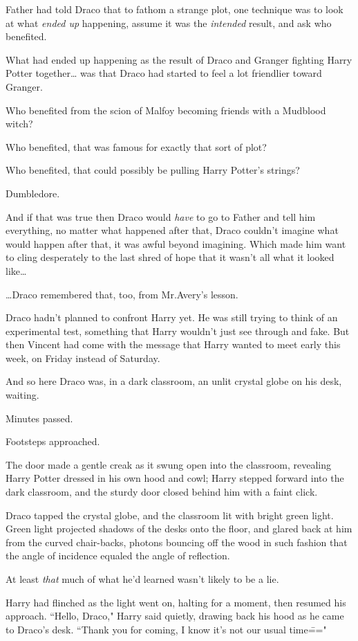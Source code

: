 Father had told Draco that to fathom a strange plot, one technique was to look at what \emph{ended up} happening, assume it was the \emph{intended} result, and ask who benefited.

What had ended up happening as the result of Draco and Granger fighting Harry Potter together{\ldots} was that Draco had started to feel a lot friendlier toward Granger.

Who benefited from the scion of Malfoy becoming friends with a Mudblood witch?

Who benefited, that was famous for exactly that sort of plot?

Who benefited, that could possibly be pulling Harry Potter's strings?

Dumbledore.

And if that was true then Draco would \emph{have} to go to Father and tell him everything, no matter what happened after that, Draco couldn't imagine what would happen after that, it was awful beyond imagining. Which made him want to cling desperately to the last shred of hope that it wasn't all what it looked like{\ldots}

{\ldots}Draco remembered that, too, from Mr.\?Avery's lesson.

Draco hadn't planned to confront Harry yet. He was still trying to think of an experimental test, something that Harry wouldn't just see through and fake. But then Vincent had come with the message that Harry wanted to meet early this week, on Friday instead of Saturday.

And so here Draco was, in a dark classroom, an unlit crystal globe on his desk, waiting.

Minutes passed.

Footsteps approached.

The door made a gentle creak as it swung open into the classroom, revealing Harry Potter dressed in his own hood and cowl; Harry stepped forward into the dark classroom, and the sturdy door closed behind him with a faint click.

Draco tapped the crystal globe, and the classroom lit with bright green light. Green light projected shadows of the desks onto the floor, and glared back at him from the curved chair-backs, photons bouncing off the wood in such fashion that the angle of incidence equaled the angle of reflection.

At least \emph{that} much of what he'd learned wasn't likely to be a lie.

Harry had flinched as the light went on, halting for a moment, then resumed his approach. ``Hello, Draco," Harry said quietly, drawing back his hood as he came to Draco's desk. ``Thank you for coming, I know it's not our usual time\==="

